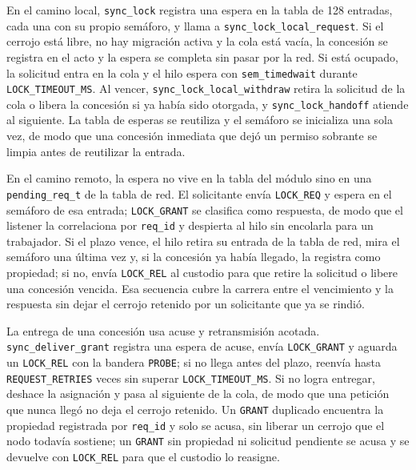 En el camino local, \texttt{sync\_lock} registra una espera en la tabla de 128 entradas, cada una con su propio semáforo, y llama a \texttt{sync\_lock\_local\_request}. Si el cerrojo está libre, no hay migración activa y la cola está vacía, la concesión se registra en el acto y la espera se completa sin pasar por la red. Si está ocupado, la solicitud entra en la cola y el hilo espera con \texttt{sem\_timedwait} durante \texttt{LOCK\_TIMEOUT\_MS}. Al vencer, \texttt{sync\_lock\_local\_withdraw} retira la solicitud de la cola o libera la concesión si ya había sido otorgada, y \texttt{sync\_lock\_handoff} atiende al siguiente. La tabla de esperas se reutiliza y el semáforo se inicializa una sola vez, de modo que una concesión inmediata que dejó un permiso sobrante se limpia antes de reutilizar la entrada.

En el camino remoto, la espera no vive en la tabla del módulo sino en una \texttt{pending\_req\_t} de la tabla de red. El solicitante envía \texttt{LOCK\_REQ} y espera en el semáforo de esa entrada; \texttt{LOCK\_GRANT} se clasifica como respuesta, de modo que el listener la correlaciona por \texttt{req\_id} y despierta al hilo sin encolarla para un trabajador. Si el plazo vence, el hilo retira su entrada de la tabla de red, mira el semáforo una última vez y, si la concesión ya había llegado, la registra como propiedad; si no, envía \texttt{LOCK\_REL} al custodio para que retire la solicitud o libere una concesión vencida. Esa secuencia cubre la carrera entre el vencimiento y la respuesta sin dejar el cerrojo retenido por un solicitante que ya se rindió.

La entrega de una concesión usa acuse y retransmisión acotada. \texttt{sync\_deliver\_grant} registra una espera de acuse, envía \texttt{LOCK\_GRANT} y aguarda un \texttt{LOCK\_REL} con la bandera \texttt{PROBE}; si no llega antes del plazo, reenvía hasta \texttt{REQUEST\_RETRIES} veces sin superar \texttt{LOCK\_TIMEOUT\_MS}. Si no logra entregar, deshace la asignación y pasa al siguiente de la cola, de modo que una petición que nunca llegó no deja el cerrojo retenido. Un \texttt{GRANT} duplicado encuentra la propiedad registrada por \texttt{req\_id} y solo se acusa, sin liberar un cerrojo que el nodo todavía sostiene; un \texttt{GRANT} sin propiedad ni solicitud pendiente se acusa y se devuelve con \texttt{LOCK\_REL} para que el custodio lo reasigne.

